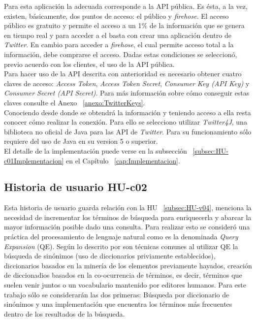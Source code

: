 Para esta aplicación la adecuada corresponde a la API pública. Es ésta, a la vez, existen, básicamente, dos puntos de acceso: el público y \textit{firehose}. El acceso público es gratuito y permite el acceso a un 1\% de la información que se genera en tiempo real y para acceder a el basta con crear una aplicación dentro de \textit{Twitter}. En cambio para acceder a \textit{firehose}, el cual permite acceso total a la información, debe comprarse el acceso. Dadas estas condiciones se seleccionó, previo acuerdo con los clientes, el uso de la API pública.\\

Para hacer uso de la API descrita con anterioridad es necesario obtener cuatro claves de acceso: \textit{Access Token}, \textit{Access Token Secret}, \textit{Consumer Key (API Key)} y \textit{Consumer Secret (API Secret)}. Para más información sobre cómo conseguir estas claves consulte el Anexo ~\ref{anexo:TwitterKeys}.\\

Conociendo desde donde se obtendrá la información y teniendo acceso a ella resta conocer cómo realizar la conexión. Para ello se selecciono utilizar \textit{Twitter4J}, una biblioteca no oficial de Java para las API de \textit{Twitter}. Para su funcionamiento sólo requiere del uso de Java en su version 5 o superior.\\

El detalle de la implementación puede verse en la subsección ~\ref{subsec:HU-c01Implementacion} en el Capítulo ~\ref{cap:Implementacion}.

\subsection{Historia de usuario HU-c02}
\label{subsec:HU-c02}

Esta historia de usuario guarda relación con la HU ~\ref{subsec:HU-v04}, menciona la necesidad de incrementar los términos de búsqueda para enriquecerla y abarcar la mayor información posible dado una consulta. Para realizar esto se consideró una práctica del procesamiento de lenguaje natural como es la denominada \textit{Query Expansion} (QE). Según lo descrito por \cite{IRQE} son técnicas comunes al utilizar QE la búsqueda de sinónimos (uso de diccionarios priviamente establecidos), diccionarios basados en la minería de los elementos previamente hayados, creación de diccionadios basados en la co-ocurrencia de términos, es decir, términos que suelen venir juntos o un vocabulario mantenido por editores humanos. Para este trabajo sólo se considerarán las dos primeras: Búsqueda por diccionario de sinónimos y una implementación que encuentra los términos más frecuentes dentro de los resultados de la búsqueda.

